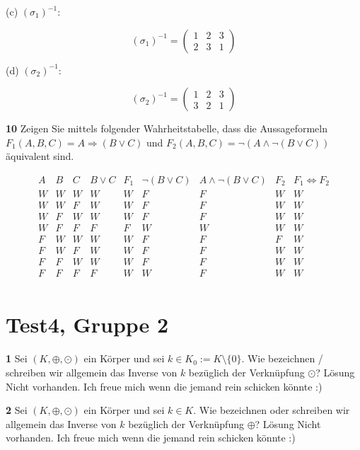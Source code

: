 \documentclass[11pt]{article}
\begin{document}
(c) \((\sigma_{1})^{-1}\):

\[
    (\sigma_{1})^{-1} = \begin{pmatrix} 1 & 2 & 3 \\ 2 & 3 & 1 \end{pmatrix}
\]

(d) \((\sigma_{2})^{-1}\):

\[
    (\sigma_{2})^{-1} = \begin{pmatrix} 1 & 2 & 3 \\ 3 & 2 & 1 \end{pmatrix}
\]


\textbf{10} Zeigen Sie mittels folgender Wahrheitstabelle, dass die Aussageformeln \(F_1(A,B,C) = A \Rightarrow (B \lor C)\) und \(F_2(A,B,C) = \neg(A \land \neg(B \lor C))\) äquivalent sind.

\[
    \begin{array}{ccc|c|c|c|c|c|c}
        A & B & C & B \lor C & F_1 & \neg(B \lor C) & A \land \neg(B \lor C) & F_2 & F_1 \Leftrightarrow F_2 \\
        \hline
        W & W & W & W & W & F & F & W & W \\
        W & W & F & W & W & F & F & W & W \\
        W & F & W & W & W & F & F & W & W \\
        W & F & F & F & F & W & W & W & W \\
        F & W & W & W & W & F & F & F & W \\
        F & W & F & W & W & F & F & W & W \\
        F & F & W & W & W & F & F & W & W \\
        F & F & F & F & W & W & F & W & W \\
    \end{array}
\]

\section{Test4, Gruppe 2}

    \textbf{1} Sei \((K, \oplus, \odot)\) ein Körper und sei \(k \in K_0 := K \setminus \{0\}\). Wie bezeichnen / schreiben wir allgemein das Inverse von \(k\) bezüglich der Verknüpfung \(\odot\)?\newline
    Lösung Nicht vorhanden. Ich freue mich wenn die jemand rein schicken könnte :)\newline

    \textbf{2} Sei \((K, \oplus, \odot)\) ein Körper und sei \(k \in K\). Wie bezeichnen oder schreiben wir allgemein das Inverse von \(k\) bezüglich der Verknüpfung \(\oplus\)?\newline
    Lösung Nicht vorhanden. Ich freue mich wenn die jemand rein schicken könnte :)\newline
\end{document}
